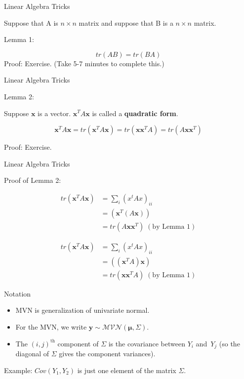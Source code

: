\documentclass[
  ignorenonframetext,
]{beamer}
\newcommand{\bmu}{\bm{\mu}}
\begin{document}
\begin{frame}{Linear Algebra Tricks}
\protect\hypertarget{linear-algebra-tricks}{}

Suppose that A is \(n \times n\) matrix and suppose that B is a
\(n \times n\) matrix.

Lemma 1:

\[tr(AB) = tr(BA)\] Proof: Exercise. (Take 5-7 minutes to complete
this.)

\end{frame}

\begin{frame}{Linear Algebra Tricks}
\protect\hypertarget{linear-algebra-tricks-1}{}

Lemma 2:

Suppose \(\bm{x}\) is a vector. \(\bm{x}^TA\bm{x}\) is called a
\textbf{quadratic form}.

\[\bm{x}^TA\bm{x} = tr(\bm{x}^TA\bm{x}) = tr(\bm{x}\bm{x}^TA) = tr(A\bm{x}\bm{x}^T)\]

Proof: Exercise.

\end{frame}

\begin{frame}{Linear Algebra Tricks}
\protect\hypertarget{linear-algebra-tricks-2}{}

Proof of Lemma 2:

\begin{align}
tr({\bm{x}^TA\bm{x}})  
&= \sum_i (x^tAx)_{ii} \\ 
& = (\bm{x}^T(A\bm{x})) \\
& = tr(A\bm{x}\bm{x}^T) \; (\text{by Lemma 1})
\end{align}

\begin{align}
tr({\bm{x}^TA\bm{x}})  
&= \sum_i (x^tAx)_{ii} \\ 
& = ((\bm{x}^TA)\bm{x}) \\
& = tr(\bm{x}\bm{x}^TA)\; (\text{by Lemma 1})
\end{align}

\end{frame}

\begin{frame}{Notation}
\protect\hypertarget{notation}{}

\begin{itemize}
\item MVN is generalization of univariate normal.
\item For the MVN, we write $\bm{y} \sim
\mathcal{MVN}(\bmu,\Sigma)$. 
\item The $(i,j)^{\text{th}}$
component of $\Sigma$ is the covariance between $Y_i$ and~$Y_j$ (so
the diagonal of $\Sigma$ gives the component variances).
\end{itemize}

Example: \(Cov(Y_1, Y_2)\) is just one element of the matrix \(\Sigma.\)

\end{frame}
\end{document}
